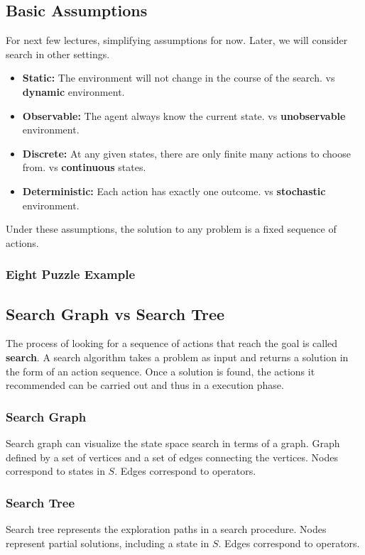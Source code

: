 \documentclass[10pt, a4paper, oneside]{book}
\theoremstyle{theoremdd}
\theoremstyle{remark}
\begin{document}
\subsection{Basic Assumptions}
For next few lectures, simplifying assumptions for now. Later, we will consider search in other settings.
\begin{itemize}
\item \textbf{Static:} The environment will not change in the course of the search. vs \textbf{dynamic} environment.
\item \textbf{Observable:} The agent always know the current state.  vs \textbf{unobservable} environment. 
\item \textbf{Discrete:} At any given states, there are only finite many actions to choose from. vs \textbf{continuous} states.
\item \textbf{Deterministic:} Each action has exactly one outcome. vs \textbf{stochastic} environment.
\end{itemize}
Under these assumptions, the solution to any problem is a fixed sequence of actions.

\subsubsection*{Eight Puzzle Example}

\subsection{Search Graph vs Search Tree}
The process of looking for a sequence of actions that reach the goal is called \textbf{search}. A search algorithm takes a problem as input and returns a solution in the form of an action sequence. Once a solution is found, the actions it recommended can be carried out and thus in a execution phase.
\subsubsection*{Search Graph}
Search graph can visualize the state space search in terms of a graph. Graph defined by a set of vertices and a set of edges connecting the vertices. Nodes correspond to states in $S$. Edges correspond to operators. 
\subsubsection*{Search Tree}
Search tree represents the exploration paths in a search procedure. Nodes represent partial solutions, including a state in $S$. Edges correspond to operators. 
\end{document}
